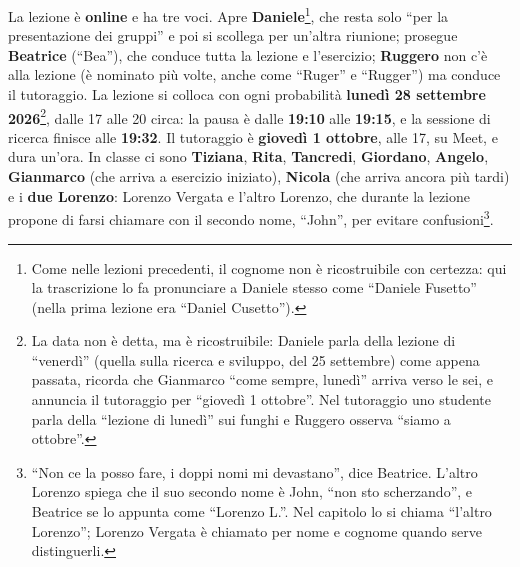 La lezione è \textbf{online} e ha tre voci. Apre \textbf{Daniele}\footnote{Come
nelle lezioni precedenti, il cognome non è ricostruibile con certezza: qui la
trascrizione lo fa pronunciare a Daniele stesso come ``Daniele Fusetto'' (nella
prima lezione era ``Daniel Cusetto'').}, che resta solo ``per la presentazione dei
gruppi'' e poi si scollega per un'altra riunione; prosegue \textbf{Beatrice}
(``Bea''), che conduce tutta la lezione e l'esercizio; \textbf{Ruggero} non c'è
alla lezione (è nominato più volte, anche come ``Ruger'' e ``Rugger'') ma conduce
il tutoraggio. La lezione si colloca con ogni probabilità \textbf{lunedì 28
settembre 2026}\footnote{La data non è detta, ma è ricostruibile: Daniele parla
della lezione di ``venerdì'' (quella sulla ricerca e sviluppo, del 25 settembre)
come appena passata, ricorda che Gianmarco ``come sempre, lunedì'' arriva verso le
sei, e annuncia il tutoraggio per ``giovedì 1 ottobre''. Nel tutoraggio uno
studente parla della ``lezione di lunedì'' sui funghi e Ruggero osserva ``siamo a
ottobre''.}, dalle 17 alle 20 circa: la pausa è dalle \textbf{19:10} alle
\textbf{19:15}, e la sessione di ricerca finisce alle \textbf{19:32}. Il tutoraggio
è \textbf{giovedì 1 ottobre}, alle 17, su Meet, e dura un'ora. In classe ci sono
\textbf{Tiziana}, \textbf{Rita}, \textbf{Tancredi}, \textbf{Giordano},
\textbf{Angelo}, \textbf{Gianmarco} (che arriva a esercizio iniziato),
\textbf{Nicola} (che arriva ancora più tardi) e i \textbf{due Lorenzo}: Lorenzo
Vergata e l'altro Lorenzo, che durante la lezione propone di farsi chiamare con il
secondo nome, ``John'', per evitare confusioni\footnote{``Non ce la posso fare, i
doppi nomi mi devastano'', dice Beatrice. L'altro Lorenzo spiega che il suo secondo
nome è John, ``non sto scherzando'', e Beatrice se lo appunta come ``Lorenzo L.''.
Nel capitolo lo si chiama ``l'altro Lorenzo''; Lorenzo Vergata è chiamato per nome e
cognome quando serve distinguerli.}.

